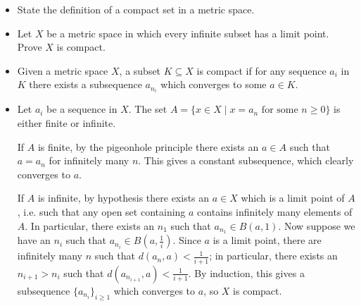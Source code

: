 \begin{problem}
\begin{itemize}
    \item[(a)] State the definition of a compact set in a metric space.
    \item[(b)] Let $X$ be a metric space in which every infinite subset has a limit point. Prove $X$ is compact.
\end{itemize}
\begin{solution}
\begin{itemize}
    \item[(a)] Given a metric space $X$, a subset $K \subseteq X$ is compact if for any sequence $a_i$ in $K$ there exists a subsequence $a_{n_i}$ which converges to some $a \in K$.
    \item[(b)] Let $a_i$ be a sequence in $X$. The set $A = \{x \in X \mid x = a_n \text{ for some } n \geq 0\}$ is either finite or infinite.
    
    If $A$ is finite, by the pigeonhole principle there exists an $a \in A$ such that $a = a_n$ for infinitely many $n$. This gives a constant subsequence, which clearly converges to $a$.
    
    If $A$ is infinite, by hypothesis there exists an $a \in X$ which is a limit point of $A$, i.e. such that any open set containing $a$ contains infinitely many elements of $A$. In particular, there exists an $n_1$ such that $a_{n_1} \in B(a,1)$. Now suppose we have an $n_i$ such that $a_{n_i} \in B(a,\frac{1}{i})$. Since $a$ is a limit point, there are infinitely many $n$ such that $d(a_n,a) < \frac{1}{i+1}$; in particular, there exists an $n_{i+1} > n_i$ such that $d(a_{n_{i+1}},a) < \frac{1}{i+1}$. By induction, this gives a subsequence $\{a_{n_i}\}_{i \geq 1}$ which converges to $a$, so $X$ is compact.
\end{itemize}
\end{solution}
\end{problem}

